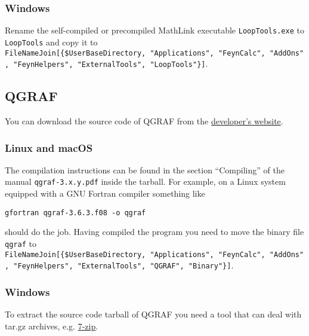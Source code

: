 \documentclass[../FeynHelpersManual.tex]{subfiles}
\begin{document}
\hypertarget{windows-4}{%
\subsubsection{Windows}\label{windows-4}}

Rename the self-compiled or precompiled MathLink executable
\texttt{LoopTools.exe} to \texttt{LoopTools} and copy it to
\texttt{FileNameJoin[\allowbreak{}\{\allowbreak{}\$UserBaseDirectory,\ \allowbreak{}"Applications",\ \allowbreak{}"FeynCalc",\ \allowbreak{}"AddOns",\ \allowbreak{}"FeynHelpers",\ \allowbreak{}"ExternalTools",\ \allowbreak{}"LoopTools"\}]}.

\hypertarget{qgraf}{%
\subsection{QGRAF}\label{qgraf}}

You can download the source code of QGRAF from the
\href{http://cfif.ist.utl.pt/~paulo/qgraf.html}{developer's website}.

\hypertarget{linux-and-macos-1}{%
\subsubsection{Linux and macOS}\label{linux-and-macos-1}}

The compilation instructions can be found in the section ``Compiling''
of the manual \texttt{qgraf-3.x.y.pdf} inside the tarball. For example,
on a Linux system equipped with a GNU Fortran compiler something like

\begin{verbatim}
gfortran qgraf-3.6.3.f08 -o qgraf
\end{verbatim}

should do the job. Having compiled the program you need to move the
binary file \texttt{qgraf} to
\texttt{FileNameJoin[\allowbreak{}\{\allowbreak{}\$UserBaseDirectory,\ \allowbreak{}"Applications",\ \allowbreak{}"FeynCalc",\ \allowbreak{}"AddOns",\ \allowbreak{}"FeynHelpers",\ \allowbreak{}"ExternalTools",\ \allowbreak{}"QGRAF",\ \allowbreak{}"Binary"\}]}.

\hypertarget{windows-5}{%
\subsubsection{Windows}\label{windows-5}}

To extract the source code tarball of QGRAF you need a tool that can
deal with tar.gz archives, e.g. \href{https://www.7-zip.org/}{7-zip}.
\end{document}
